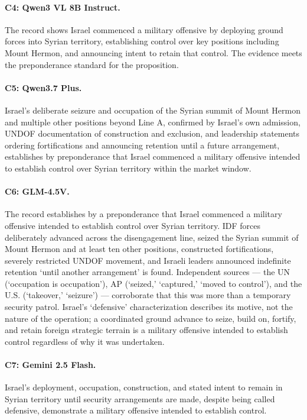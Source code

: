 \documentclass[11pt]{article}
\begin{document}
\paragraph{C4: Qwen3 VL 8B Instruct.}
The record shows Israel commenced a military offensive by deploying ground forces into Syrian territory, establishing control over key positions including Mount Hermon, and announcing intent to retain that control. The evidence meets the preponderance standard for the proposition.

\paragraph{C5: Qwen3.7 Plus.}
Israel's deliberate seizure and occupation of the Syrian summit of Mount Hermon and multiple other positions beyond Line A, confirmed by Israel's own admission, UNDOF documentation of construction and exclusion, and leadership statements ordering fortifications and announcing retention until a future arrangement, establishes by preponderance that Israel commenced a military offensive intended to establish control over Syrian territory within the market window.

\paragraph{C6: GLM-4.5V.}
The record establishes by a preponderance that Israel commenced a military offensive intended to establish control over Syrian territory.  IDF forces deliberately advanced across the disengagement line, seized the Syrian summit of Mount Hermon and at least ten other positions, constructed fortifications, severely restricted UNDOF movement, and Israeli leaders announced indefinite retention `until another arrangement' is found.  Independent sources --- the UN (`occupation is occupation'), AP (`seized,' `captured,' `moved to control'), and the U.S. (`takeover,' `seizure') --- corroborate that this was more than a temporary security patrol.  Israel's `defensive' characterization describes its motive, not the nature of the operation; a coordinated ground advance to seize, build on, fortify, and retain foreign strategic terrain is a military offensive intended to establish control regardless of why it was undertaken.

\paragraph{C7: Gemini 2.5 Flash.}
Israel's deployment, occupation, construction, and stated intent to remain in Syrian territory until security arrangements are made, despite being called defensive, demonstrate a military offensive intended to establish control.
\end{document}
